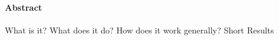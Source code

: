 \cleardoublepage

\vspace {2cm}
\begin{center}
\paragraph{Abstract}
\hrulefill
\end{center}
What is it? \newline
What does it do?\newline
How does it work generally?\newline
Short Results\newline
